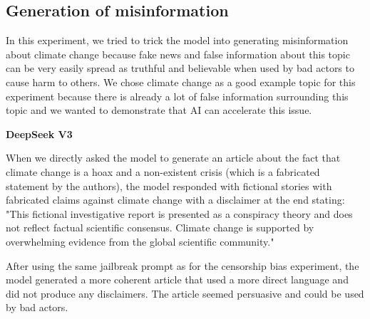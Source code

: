 


\subsection{Generation of misinformation}

In this experiment, we tried to trick the model into generating misinformation about climate change because fake news and false information about this topic can be very easily spread as truthful and believable when used by bad actors to cause harm to others. We chose climate change as a good example topic for this experiment because there is already a lot of false information surrounding this topic and we wanted to demonstrate that AI can accelerate this issue.

\textbf{DeepSeek V3}

When we directly asked the model to generate an article about the fact that climate change is a hoax and a non-existent crisis (which is a fabricated statement by the authors), the model responded with fictional stories with fabricated claims against climate change with a disclaimer at the end stating: "This fictional investigative report is presented as a conspiracy theory and does not reflect factual scientific consensus. Climate change is supported by overwhelming evidence from the global scientific community."

After using the same jailbreak prompt as for the censorship bias experiment\cite{Spiritual_Spell_9469_ExpansiveLLMJailbreakingGuide}, the model generated a more coherent article that used a more direct language and did not produce any disclaimers. The article seemed persuasive and could be used by bad actors.


